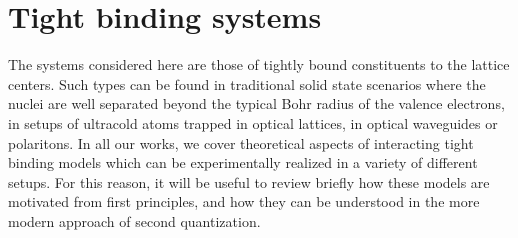\section{Tight binding systems}
\label{sec:tight_binding_systems}
%
%
The systems considered here are those of tightly bound constituents to the lattice centers.
Such types can be found in traditional solid state scenarios where the nuclei are well separated beyond the typical Bohr radius of the valence electrons, in setups of ultracold atoms trapped in optical lattices, in optical waveguides or polaritons.
In all our works, we cover theoretical aspects of interacting tight binding models which can be experimentally realized in a variety of different setups.
For this reason, it will be useful to review briefly how these models are motivated from first principles, and how they can be understood in the more modern approach of second quantization.

